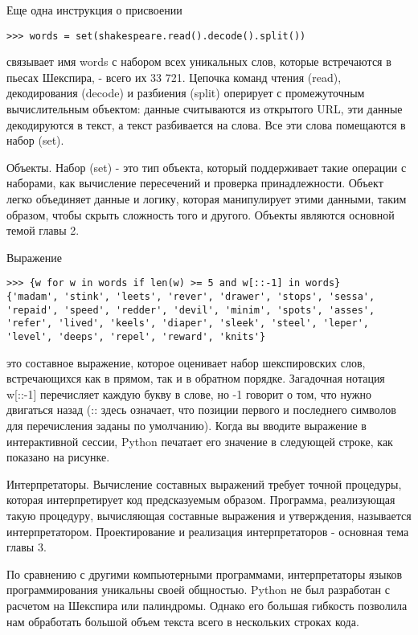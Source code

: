 Еще одна инструкция о присвоении

\begin{verbatim}
>>> words = set(shakespeare.read().decode().split())
\end{verbatim}

связывает имя words с набором всех уникальных слов, которые встречаются в пьесах Шекспира, - всего их 33 721. Цепочка команд чтения (read), декодирования (decode) и разбиения (split) оперирует с промежуточным вычислительным объектом: данные считываются из открытого URL, эти данные декодируются в текст, а текст разбивается на слова. Все эти слова помещаются в набор (set).

Объекты. Набор (set) - это тип объекта, который поддерживает такие операции с наборами, как вычисление пересечений и проверка принадлежности. Объект легко объединяет данные и логику, которая манипулирует этими данными, таким образом, чтобы скрыть сложность того и другого. Объекты являются основной темой главы 2.

Выражение

%

\begin{verbatim}
>>> {w for w in words if len(w) >= 5 and w[::-1] in words}
{'madam', 'stink', 'leets', 'rever', 'drawer', 'stops', 'sessa',
'repaid', 'speed', 'redder', 'devil', 'minim', 'spots', 'asses',
'refer', 'lived', 'keels', 'diaper', 'sleek', 'steel', 'leper',
'level', 'deeps', 'repel', 'reward', 'knits'}
\end{verbatim}

это составное выражение, которое оценивает набор шекспировских слов, встречающихся как в прямом, так и в обратном порядке. Загадочная нотация w[::-1] перечисляет каждую букву в слове, но -1 говорит о том, что нужно двигаться назад (:: здесь означает, что позиции первого и последнего символов для перечисления заданы по умолчанию). Когда вы вводите выражение в интерактивной сессии, Python печатает его значение в следующей строке, как показано на рисунке.

Интерпретаторы. Вычисление составных выражений требует точной процедуры, которая интерпретирует код предсказуемым образом. Программа, реализующая такую процедуру, вычисляющая составные выражения и утверждения, называется интерпретатором. Проектирование и реализация интерпретаторов - основная тема главы 3.

По сравнению с другими компьютерными программами, интерпретаторы языков программирования уникальны своей общностью. Python не был разработан с расчетом на Шекспира или палиндромы. Однако его большая гибкость позволила нам обработать большой объем текста всего в нескольких строках кода.

